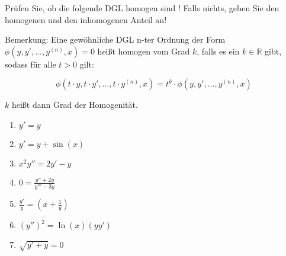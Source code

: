 \item Prüfen Sie, ob die folgende DGL homogen sind ! Falls nichts, geben Sie den homogenen und den inhomogenen Anteil an!

Bemerkung: Eine gewöhnliche DGL n-ter Ordnung der Form $\phi(y, y', ..., y^{(n)}, x)=0$ heißt homogen vom Grad $k$, falls es ein $k \in \mathbb{R}$ gibt, sodass für alle $t > 0$ gilt:

$$\phi(t \cdot y, t \cdot y', ..., t \cdot y^{(n)},x) = t^k \cdot \phi(y,y',...,y^{(n)},x)$$

$k$ heißt dann Grad der Homogenität.

\begin{enumerate}
\item $y'=y$
\item $y'=y+\sin(x)$
\item $x^2y''=2y'-y$
\item $0=\frac{y''+2y}{y'''-3y}$
\item $\frac{y'}{y}=(x+\frac{1}{y})$
\item $(y'')^2=\ln(x)(yy')$
\item $\sqrt{y'+y}=0$
\end{enumerate}

